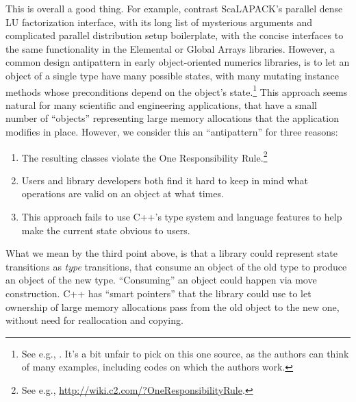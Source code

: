 This is overall a good thing.  For example, contrast ScaLAPACK's
parallel dense LU factorization interface, with its long list of
mysterious arguments and complicated parallel distribution setup
boilerplate, with the concise interfaces to the same functionality in
the Elemental \cite{poulson2013elemental} or Global Arrays
\cite{GlobalArrays} libraries.  However, a common design antipattern
in early object-oriented numerics libraries, is to let an object of a
single type have many possible states, with many mutating instance
methods whose preconditions depend on the object's state.\footnote{See
  e.g., \cite[p. 6]{arge1996oon}.  It's a bit unfair to pick on this
  one source, as the authors can think of many examples, including
  codes on which the authors work.}
This approach seems natural for many scientific and engineering
applications, that have a small number of ``objects'' representing
large memory allocations that the application modifies in place.
However, we consider this an ``antipattern'' for three reasons:
\begin{enumerate}
\item The resulting classes violate the One Responsibility
  Rule.\footnote{See e.g.,
    \url{http://wiki.c2.com/?OneResponsibilityRule}.}
\item Users and library developers both find it hard to keep in mind
  what operations are valid on an object at what times.
\item This approach fails to use C++'s type system and language
  features to help make the current state obvious to users.
\end{enumerate}
What we mean by the third point above, is that a library could
represent state transitions as \emph{type} transitions, that consume
an object of the old type to produce an object of the new type.
``Consuming'' an object could happen via move construction.  C++ has
``smart pointers'' that the library could use to let ownership of
large memory allocations pass from the old object to the new one,
without need for reallocation and copying.

